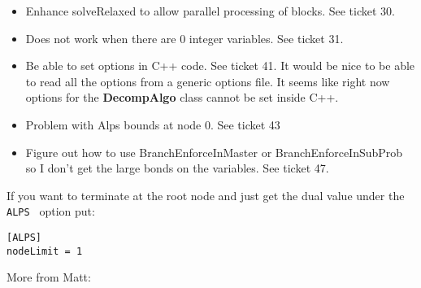 \begin{itemize}
  \item Enhance solveRelaxed to allow parallel processing of blocks. See ticket
  30.
  \item Does not work when there are 0 integer variables. See ticket 31.
  
  \item Be able to set options in C++ code. See ticket 41.  It would be nice to
  be able to read all the options from a generic options file. It seems like
  right now options for the {\bf DecompAlgo } class cannot be set inside C++.
  
  \item Problem with Alps  bounds at node 0. See ticket 43
  
  \item Figure out how to use BranchEnforceInMaster or BranchEnforceInSubProb so
  I don't get the large bonds on the variables. See ticket 47.
\end{itemize}



 
 If you want to terminate at the root node and just get the dual value under the {\tt ALPS } option put:
 
\begin{verbatim}
[ALPS]
nodeLimit = 1
\end{verbatim}

More from Matt:



